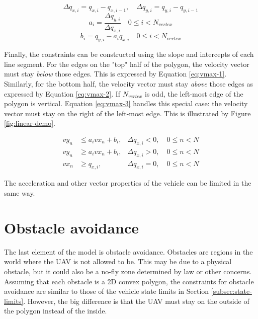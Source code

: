 \begin{equation}
\label{eq:lin-delta}
\Delta q_{x,i} = q_{x,i} - q_{x,i-1}, \quad \Delta q_{y,i} = q_{y,i} - q_{y,i-1}
\end{equation}
\begin{equation}
\label{eq:lin-a}
a_i = \dfrac{\Delta q_{y,i}}{\Delta q_{x,i}} \quad 0 \leq i < N_{vertex}
\end{equation}
\begin{equation}
\label{eq:lin-b}
b_i = q_{y,i} - a_i q_{x,i}  \quad 0 \leq i < N_{vertex}
\end{equation}




Finally, the constraints can be constructed using the slope and intercepts of each line segment. For the edges on the "top" half of the polygon, the velocity vector must stay \emph{below} those edges. This is expressed by Equation \ref{eq:vmax-1}. Similarly, for the bottom half, the velocity vector must stay \emph{above} those edges as expressed by Equation \ref{eq:vmax-2}. If $N_{vertex}$ is odd, the left-most edge of the polygon is vertical. Equation \ref{eq:vmax-3} handles this special case: the velocity vector must stay on the right of the left-most edge. This is illustrated by Figure \ref{fig:linear-demo}.



\begin{align}
vy_{n} &\leq a_i vx_{n} + b_i,  & \Delta q_{x,i} < 0, \quad 0 \leq n < N  \label{eq:vmax-1} \\
vy_{n} &\geq a_i vx_{n} + b_i,  & \Delta q_{x,i} > 0, \quad 0 \leq n < N \label{eq:vmax-2} \\
vx_{n} &\geq q_{x,i},  & \Delta q_{x,i} = 0, \quad 0 \leq n < N \label{eq:vmax-3}
\end{align}

The acceleration and other vector properties of the vehicle can be limited in the same way. 

\section{Obstacle avoidance}
\label{subsec:obs-avoid}

The last element of the model is obstacle avoidance. Obstacles are regions in the world where the UAV is not allowed to be. This may be due to a physical obstacle, but it could also be a no-fly zone determined by law or other concerns. \\
Assuming that each obstacle is a 2D convex polygon, the constraints for obstacle avoidance are similar to those of the vehicle state limits in Section \ref{subsec:state-limits}. However, the big difference is that the UAV must stay on the outside of the polygon instead of the inside. \\

